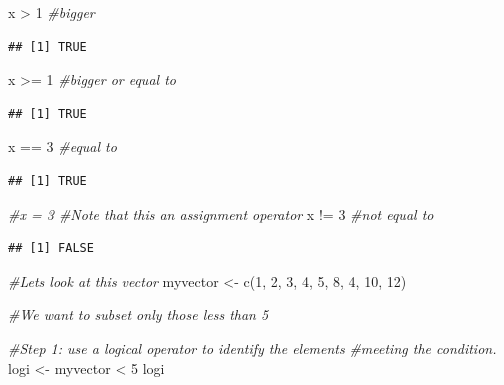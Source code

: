 \documentclass[
]{book}
\newenvironment{Shaded}{\begin{snugshade}}{\end{snugshade}}
\newcommand{\CommentTok}[1]{\textcolor[rgb]{0.56,0.35,0.01}{\textit{#1}}}
\newcommand{\DecValTok}[1]{\textcolor[rgb]{0.00,0.00,0.81}{#1}}
\newcommand{\FunctionTok}[1]{\textcolor[rgb]{0.00,0.00,0.00}{#1}}
\newcommand{\NormalTok}[1]{#1}
\newcommand{\OtherTok}[1]{\textcolor[rgb]{0.56,0.35,0.01}{#1}}
\newcommand{\SpecialCharTok}[1]{\textcolor[rgb]{0.00,0.00,0.00}{#1}}
\begin{document}
\begin{Shaded}
\begin{Highlighting}[]
\NormalTok{x }\SpecialCharTok{\textgreater{}} \DecValTok{1}      \CommentTok{\#bigger}
\end{Highlighting}
\end{Shaded}

\begin{verbatim}
## [1] TRUE
\end{verbatim}

\begin{Shaded}
\begin{Highlighting}[]
\NormalTok{x }\SpecialCharTok{\textgreater{}=} \DecValTok{1}     \CommentTok{\#bigger or equal to}
\end{Highlighting}
\end{Shaded}

\begin{verbatim}
## [1] TRUE
\end{verbatim}

\begin{Shaded}
\begin{Highlighting}[]
\NormalTok{x }\SpecialCharTok{==} \DecValTok{3}     \CommentTok{\#equal to}
\end{Highlighting}
\end{Shaded}

\begin{verbatim}
## [1] TRUE
\end{verbatim}

\begin{Shaded}
\begin{Highlighting}[]
\CommentTok{\#x = 3     \#Note that this an assignment operator}
\NormalTok{x }\SpecialCharTok{!=} \DecValTok{3}     \CommentTok{\#not equal to}
\end{Highlighting}
\end{Shaded}

\begin{verbatim}
## [1] FALSE
\end{verbatim}

\begin{Shaded}
\begin{Highlighting}[]
\CommentTok{\#Let\textquotesingle{}s look at this vector}
\NormalTok{myvector }\OtherTok{\textless{}{-}} \FunctionTok{c}\NormalTok{(}\DecValTok{1}\NormalTok{, }\DecValTok{2}\NormalTok{, }\DecValTok{3}\NormalTok{, }\DecValTok{4}\NormalTok{, }\DecValTok{5}\NormalTok{, }\DecValTok{8}\NormalTok{, }\DecValTok{4}\NormalTok{, }\DecValTok{10}\NormalTok{, }\DecValTok{12}\NormalTok{)}

\CommentTok{\#We want to subset only those less than 5}

\CommentTok{\#Step 1: use a logical operator to identify the elements}
\CommentTok{\#meeting the condition.}
\NormalTok{logi }\OtherTok{\textless{}{-}}\NormalTok{ myvector }\SpecialCharTok{\textless{}} \DecValTok{5} 
\NormalTok{logi}
\end{Highlighting}
\end{Shaded}
\end{document}
